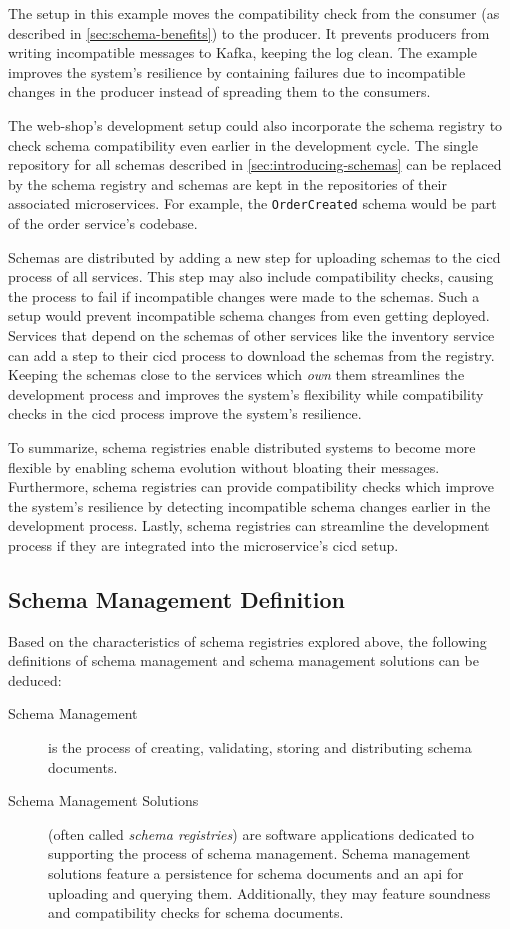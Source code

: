 The setup in this example moves the compatibility check from the consumer (as described in \ref{sec:schema-benefits}) to the producer.
It prevents producers from writing incompatible messages to Kafka, keeping the log clean.
The example improves the system's resilience by containing failures due to incompatible changes in the producer instead of spreading them to the consumers.

The web-shop's development setup could also incorporate the schema registry to check schema compatibility even earlier in the development cycle.
The single repository for all schemas described in \ref{sec:introducing-schemas} can be replaced by the schema registry and schemas are kept in the repositories of their associated microservices.
For example, the \texttt{OrderCreated} schema would be part of the order service's codebase.

Schemas are distributed by adding a new step for uploading schemas to the \gls{cicd} process of all services.
This step may also include compatibility checks, causing the process to fail if incompatible changes were made to the schemas.
Such a setup would prevent incompatible schema changes from even getting deployed.
Services that depend on the schemas of other services like the inventory service can add a step to their \gls{cicd} process to download the schemas from the registry.
Keeping the schemas close to the services which \emph{own} them streamlines the development process and improves the system's flexibility while compatibility checks in the \gls{cicd} process improve the system's resilience.

To summarize, schema registries enable distributed systems to become more flexible by enabling schema evolution without bloating their messages.
Furthermore, schema registries can provide compatibility checks which improve the system's resilience by detecting incompatible schema changes earlier in the development process.
Lastly, schema registries can streamline the development process if they are integrated into the microservice's \gls{cicd} setup.

\subsection{Schema Management Definition}

Based on the characteristics of schema registries explored above, the following definitions of schema management and schema management solutions can be deduced:

\begin{description}
  \item[Schema Management] is the process of creating, validating, storing and distributing schema documents.
  \item[Schema Management Solutions] (often called \emph{schema registries}) are software applications dedicated to supporting the process of schema management.
  Schema management solutions feature a persistence for schema documents and an \gls{api} for uploading and querying them.
  Additionally, they may feature soundness and compatibility checks for schema documents.
\end{description}

